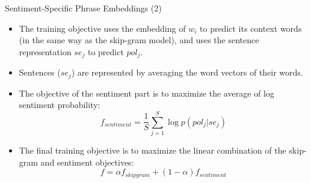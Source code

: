 \documentclass[handout]{beamer}
\begin{document}
\begin{frame}{Sentiment-Specific Phrase Embeddings (2)}
\begin{scriptsize}
\begin{itemize}

\item The training objective uses the embedding of $w_i$ to predict its context words (in the same way as the skip-gram model), and uses the sentence representation $se_j$ to predict $pol_j$.


\item Sentences ($se_j$) are represented by averaging the word vectors of their words.

\item The  objective of the sentiment part is to maximize the average of log sentiment probability: 
\begin{displaymath}
f_{sentiment}= \frac{1}{S}\sum_{j=1}^{S}\log p(pol_j|se_j)
\end{displaymath}

\item The final training objective is to maximize the linear combination of the skip-gram and sentiment objectives: 
\begin{displaymath}
f = \alpha f_{skipgram} + (1- \alpha)f_{sentiment}
\end{displaymath}

\end{itemize}
\end{scriptsize}
\end{frame}
\end{document}
